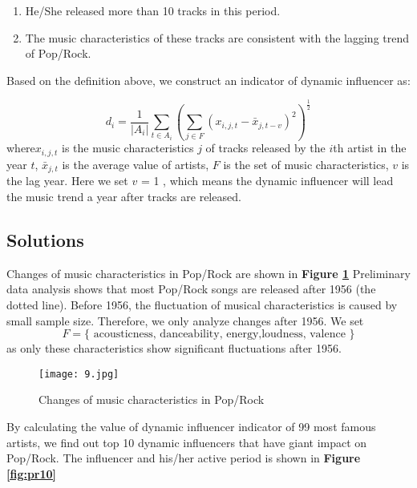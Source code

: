 \documentclass[12pt]{article}  %
\begin{document}
	\begin{enumerate}
		\setlength{\parsep}{2ex} %
		\setlength{\topsep}{2ex} %
		\setlength{\itemsep}{1ex} %
		\item He/She released more than 10 tracks in this period.
		\item The music characteristics of these tracks are consistent with the lagging trend of Pop/Rock.
	\end{enumerate}
	
	Based on the definition above, we construct an indicator of dynamic influencer as:
	
	\begin{equation}
		d_{i}=\frac{1}{\left|A_{i}\right|} \sum_{t \in A_{i}}\left(\sum_{j \in F}\left(x_{i, j, t}-\bar{x}_{j, t-v}\right)^{2}\right)^{\frac{1}{2}}
	\end{equation}
	where$  x_{i,j,t} $ is the music characteristics $ j $ of tracks released by the $ i $th artist in the year $ t $,  $\bar{x}_{j, t}$ is the average value of artists, $ F $ is the set of music characteristics, $ v $ is the lag year. Here we set $ v $ = 1 , which means the dynamic influencer will lead the music trend a year after tracks are released.
	
	\subsection{Solutions}
	
	Changes of music characteristics in Pop/Rock are shown in \textbf{Figure \ref{fig:9}} Preliminary data analysis shows that most Pop/Rock songs are released after 1956 (the dotted line). Before 1956, the fluctuation of musical characteristics is caused by small sample size. Therefore, we only analyze changes after 1956. We set 
	\begin{equation}
		F=\{\text { acousticness, danceability, energy,loudness, valence }\}
	\end{equation}
	as only these characteristics show significant fluctuations after 1956.
	\clearpage
	\begin{figure}[htbp]
		\centering
		\texttt{[image: 9.jpg]} 	%
		\caption{Changes of music characteristics in Pop/Rock}		%
		\label{fig:9}							%
	\end{figure}
	
	By calculating the value of dynamic influencer indicator of 99 most famous artists, we find
	out top 10 dynamic influencers that have giant impact on Pop/Rock. The influencer and his/her
	active period is shown in \textbf{Figure \ref{fig:pr10}}
	
\end{document}
